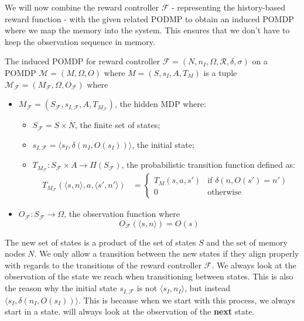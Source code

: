\label{s:induced_pomdp}
We will now combine the reward controller $\mathcal{F}$ - representing the history-based reward function - with the given related PODMP to obtain an induced POMDP where we map the memory into the system. This ensures that we don't have to keep the observation sequence in memory. 


\begin{definition}
	The induced POMDP for reward controller $\mathcal{F}=(N, n_I, \Omega, \mathcal{R}, \delta, \sigma)$ on a POMDP $\mathcal{M}=(M,\Omega,O)$ where $M=(S,s_I,A,T_{M})$ is a tuple $\mathcal{M_\mathcal{F}}=(M_\mathcal{F},\Omega,O_\mathcal{F})$ where 
	\begin{itemize}
		\item $M_\mathcal{F} = (S_\mathcal{F},s_{I,\mathcal{F}}, A, T_{M_\mathcal{F}})$, the hidden MDP where:
		\begin{itemize}
			\item $S_\mathcal{F}=S\times N$, the finite set of states;
			\item $s_{I,\mathcal{F}} = \langle s_I, \delta(n_I, O(s_I))\rangle$, the initial state;
			\item $T_{M_\mathcal{F}}:S_\mathcal{F}\times A \to \Pi(S_\mathcal{F})$, the probabilistic transition function defined as:
				\begin{align*}				
					T_{M_\mathcal{F}}(\langle s,n\rangle,a,\langle s',n'\rangle) &= \begin{cases}
						T_M(s,a,s') & \text{if } \delta(n,O(s')=n') \\
						0 & \text{otherwise}
					\end{cases}
				\end{align*}
		\end{itemize}
		\item $O_\mathcal{F}:S_\mathcal{F}\to \Omega$, the observation function where 
		\[O_\mathcal{F}(\langle s,n \rangle) = O(s)\]
		\end{itemize}
	\label{d:induced_pomdp}
\end{definition}

The new set of states is a product of the set of states $S$ and the set of memory nodes $N$. We only allow a transition between the new states if they align properly with regards to the transitions of the reward controller $\mathcal{F}$. We always look at the observation of the state we reach when transitioning between states. This is also the reason why the initial state $s_{I,\mathcal{F}}$ is not $\langle s_I, n_I\rangle$, but instead $\langle s_I, \delta(n_I,O(s_I))\rangle$. This is because when we start with this process, we always start in a state.  will always look at the observation of the \textbf{next} state.\\


